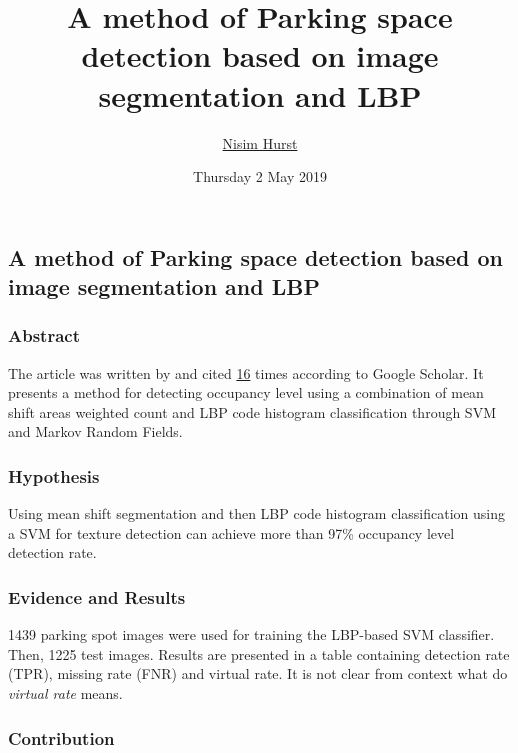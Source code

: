 \documentclass[]{article}
\title{A method of Parking space detection based on image segmentation and LBP}
\author{\href{mailto:langheran@gmail.com}{Nisim Hurst}}
\date{Thursday 2 May 2019}
\begin{document}
\maketitle

\label{toc}

\hypertarget{a-method-of-parking-space-detection-based-on-image-segmentation-and-lbp}{%
\subsection{A method of Parking space detection based on image segmentation and LBP}\label{a-method-of-parking-space-detection-based-on-image-segmentation-and-lbp}}

\hypertarget{abstract}{%
\subsubsection{Abstract}\label{abstract}}

The article was written by \autocite{Lixia_2012} and cited \href{https://scholar.google.com/scholar?cluster=2180601932752364489\&hl=en\&as_sdt=2005\&sciodt=0,5}{16} times according to Google Scholar. It presents a method for detecting occupancy level using a combination of mean shift areas weighted count and LBP code histogram classification through SVM and Markov Random Fields.

\hypertarget{hypothesis}{%
\subsubsection{Hypothesis}\label{hypothesis}}

Using mean shift segmentation and then LBP code histogram classification using a SVM for texture detection can achieve more than 97\% occupancy level detection rate.

\hypertarget{evidence-and-results}{%
\subsubsection{Evidence and Results}\label{evidence-and-results}}

1439 parking spot images were used for training the LBP-based SVM classifier. Then, 1225 test images. Results are presented in a table containing detection rate (TPR), missing rate (FNR) and virtual rate. It is not clear from context what do \emph{virtual rate} means.

\hypertarget{contribution}{%
\subsubsection{Contribution}\label{contribution}}
\end{document}
